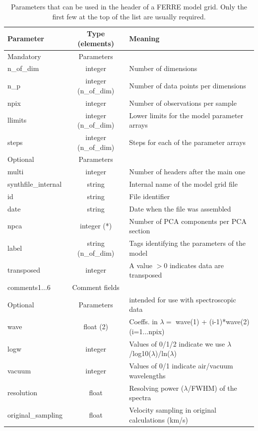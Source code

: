 \documentclass[12pt]{article}
\begin{document}
\begin{table}
\label{t1}
\caption{Parameters that can be used in the header of a FERRE model grid. 
Only the first few at the top of the list are usually required.}
\begin{tabular}{lcl}
\hline
Parameter  & Type (elements) & Meaning \\
\hline
\hline
Mandatory  & Parameters \\
\hline
n\_of\_dim & integer            & Number of dimensions \\
n\_p        & integer (n\_of\_dim)  & Number of data points per dimensions \\
npix       & integer            & Number of observations per sample \\
llimits    & integer (n\_of\_dim)  & Lower limits for the model parameter arrays \\
steps      & integer (n\_of\_dim)  & Steps for each of the parameter arrays \\
\hline
Optional   & Parameters \\
\hline
multi      &  integer              & Number of headers after the main one \\
synthfile\_internal &  string       & Internal name of the model grid file \\
id         &  string       & File identifier \\
date       &  string       & Date when the file was assembled     \\
npca       &  integer (*)  & Number of PCA components per PCA section \\
label      &  string (n\_of\_dim)  &  Tags identifying the parameters of the model \\
transposed    & integer    & A value $>0$ indicates data are transposed \\
comments1...6     &  Comment fields \\
\hline
Optional   & Parameters  & intended for use with spectroscopic data \\
\hline
wave       & float (2)     & Coeffs. in $\lambda =$ wave(1) + (i-1)*wave(2) (i=1...npix) \\
logw       & integer       & Values of 0/1/2 indicate we use $\lambda$/log10($\lambda$)/ln($\lambda$) \\
vacuum     &  integer      & Values of 0/1 indicate air/vacuum wavelengths \\
resolution    & float      & Resolving power ($\lambda$/FWHM) of the spectra \\
original\_sampling    & float & Velocity sampling in original calculations (km/s) \\

\end{tabular}
\end{table}
\end{document}
